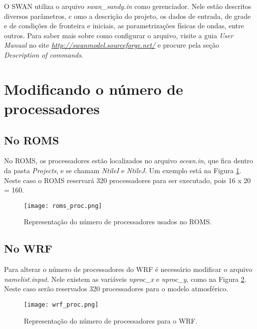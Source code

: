 \noindent O SWAN utiliza o arquivo \textit{swan\_sandy.in} como gerenciador. Nele estão descritos diversos parâmetros, c
          omo a descrição do projeto, os dados de entrada, de grade e de condições de fronteira e iniciais, as parametrizações 
          físicas de ondas, entre outros. Para saber mais sobre como configurar o arquivo, visite a guia \textit{User Manual} 
          no site \textcolor{bleu_cite}{\href{http://swanmodel.sourceforge.net/}{\textit{http://swanmodel.sourceforge.net/}}}
          e procure pela seção \textit{Description of commands}.
\bigskip

\section{Modificando o número de processadores}
\bigskip

\subsection{No ROMS}
\bigskip

\noindent No ROMS, os processadores estão localizados no arquivo \textit{ocean.in}, que fica dentro da pasta \textit{Projects},
          e se chamam \textit{NtileI} e \textit{NtileJ}. Um exemplo está na Figura \textcolor{bleu_cite}{\ref{romsproc}}. 
          Neste caso o ROMS reservará 320 processadores para ser executado, pois 16 x 20 = 160.
\bigskip

\begin{figure}[H]
    \centering
    \texttt{[image: roms\_proc.png]}
    \caption{Representação do número de processadores usados no ROMS.}
    \label{romsproc}
\end{figure}
\bigskip

\subsection{No WRF}
\bigskip

\noindent Para alterar o número de processadores do WRF é necessário modificar o arquivo \textit{namelist.input}. 
          Nele existem as variáveis \textit{nproc\_x} e \textit{nproc\_y}, como na Figura \textcolor{bleu_cite}{\ref{procswrf}}. 
          Neste caso serão reservados 320 processadores para o modelo atmosférico.
\bigskip

\begin{figure}[H]
    \centering
    \texttt{[image: wrf\_proc.png]}
    \caption{Representação do número de processadores para o WRF.}
    \label{procswrf}
\end{figure}
\bigskip

